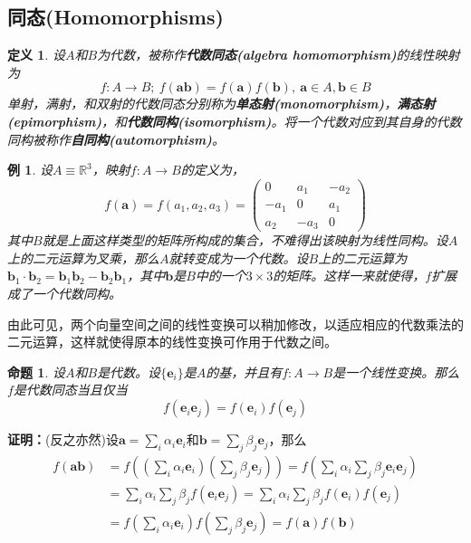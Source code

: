 \documentclass[mathserif,hyperref,UTF8,openany,b5paper]{ctexbook}
\newtheorem{exmp}{例}[section]
\newtheorem{defn}{定义}[section]
\newtheorem{pro}{命题}[section]
\begin{document}
\subsection{同态(Homomorphisms)}
\begin{defn}
    设$A$和$B$为代数，被称作\textbf{代数同态(algebra homomorphism)}的线性映射为
    \begin{equation}
        f:A\xrightarrow{}B;\ f(\mathbf{ab})=f(\mathbf{a})f(\mathbf{b}),\ \mathbf{a}\in A, \mathbf{b}\in B
    \end{equation}
    单射，满射，和双射的代数同态分别称为\textbf{单态射(monomorphism)}，\textbf{满态射(epimorphism)}，和\textbf{代数同构(isomorphism)}。将一个代数对应到其自身的代数同构被称作\textbf{自同构(automorphism)}。
\end{defn}
\begin{exmp}
    设$A\equiv\mathbb{R}^3$，映射$f:A \xrightarrow{}B$的定义为，
    \begin{equation}
        f(\mathbf{a})=f(a_1,a_2,a_3)=\left ( \begin{matrix}
            0 & a_1 & -a_2 \\ 
            -a_1 & 0 & a_1\\ 
            a_2 & -a_3 & 0
            \end{matrix} \right )
    \end{equation}
    其中$B$就是上面这样类型的矩阵所构成的集合，不难得出该映射为线性同构。设$A$上的二元运算为叉乘，那么$A$就转变成为一个代数。设$B$上的二元运算为$\mathbf{b}_1\cdot\mathbf{b}_2=\mathbf{b}_1\mathbf{b}_2-\mathbf{b}_2\mathbf{b}_1$，其中$\mathbf{b}$是$B$中的一个$3\times 3$的矩阵。这样一来就使得，$f$扩展成了一个代数同构。
\end{exmp}
由此可见，两个向量空间之间的线性变换可以稍加修改，以适应相应的代数乘法的二元运算，这样就使得原本的线性变换可作用于代数之间。
\begin{pro}
    设$A$和$B$是代数。设$\{\mathbf{e}_i\}$是$A$的基，并且有$f: A\xrightarrow{}B$是一个线性变换。那么$f$是代数同态当且仅当
    \begin{equation}
        \boxed{f(\mathbf{e}_i\mathbf{e}_j)=f(\mathbf{e}_i)f(\mathbf{e}_j)}
    \end{equation}
\end{pro}
\textbf{证明：}(反之亦然)设$\mathbf{a}=\sum_{i}\alpha_i\mathbf{e}_i$和$\mathbf{b}=\sum_{j}\beta_j\mathbf{e}_j$，那么
\begin{align}
    f(\mathbf{ab})&=f\left(\left(\sum_{i}\alpha_i\mathbf{e}_i\right)\left(\sum_{j}\beta_j\mathbf{e}_j\right)\right)=f\left(\sum_i\alpha_i\sum_{j}\beta_j\mathbf{e}_i\mathbf{e}_j\right)\\
    &=\sum_i\alpha_i\sum_{j}\beta_j f(\mathbf{e}_i\mathbf{e}_j)=\sum_i\alpha_i\sum_{j}\beta_j f(\mathbf{e}_i)f(\mathbf{e}_j)\\
    &=f\left(\sum_{i}\alpha_i\mathbf{e}_i\right)f\left(\sum_{j}\beta_j\mathbf{e}_j\right)=f(\mathbf{a})f(\mathbf{b})
\end{align}
\end{document}
